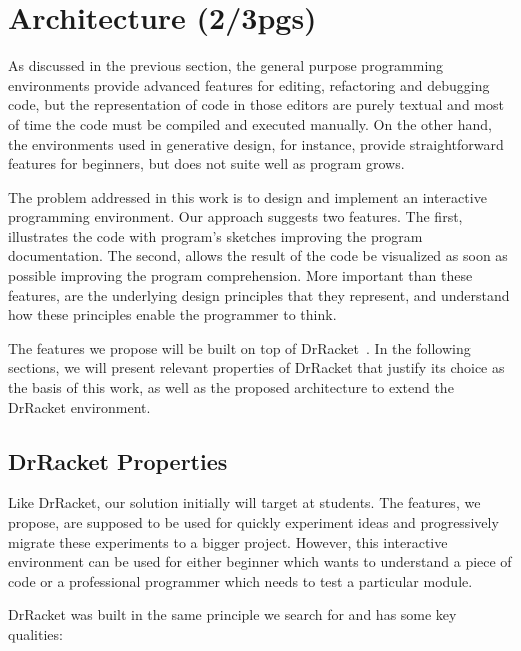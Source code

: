 
% 
% 

\section{Architecture (2/3pgs)}
\label{sec:arch}

As discussed in the previous section, the general purpose programming environments provide advanced features for editing, refactoring and debugging code, but the representation of code in those editors are purely textual and most of time the code must be compiled and executed manually. On the other hand, the environments used in generative design, for instance, provide straightforward features for beginners, but does not suite well as program grows.

The problem addressed in this work is to design and implement an interactive programming environment. Our approach suggests two features. The first, illustrates the code with program's sketches improving the program documentation. The second, allows the result of the code be visualized as soon as possible improving the program comprehension. More important than these features, are the underlying design principles that they represent, and understand how these principles enable the programmer to think.

The features we propose will be built on top of DrRacket~\cite{findler2002drscheme}. In the following sections, we will present relevant properties of DrRacket that justify its choice as the basis of this work, as well as the proposed architecture to extend the DrRacket environment.

\subsection{DrRacket Properties}

Like DrRacket, our solution initially will target at students. The features, we propose, are supposed to be used for quickly experiment ideas and progressively migrate these experiments to a bigger project. However, this interactive environment can be used for either beginner which wants to understand a piece of code or a professional programmer which needs to test a particular module.

DrRacket was built in the same principle we search for and has some key qualities:

